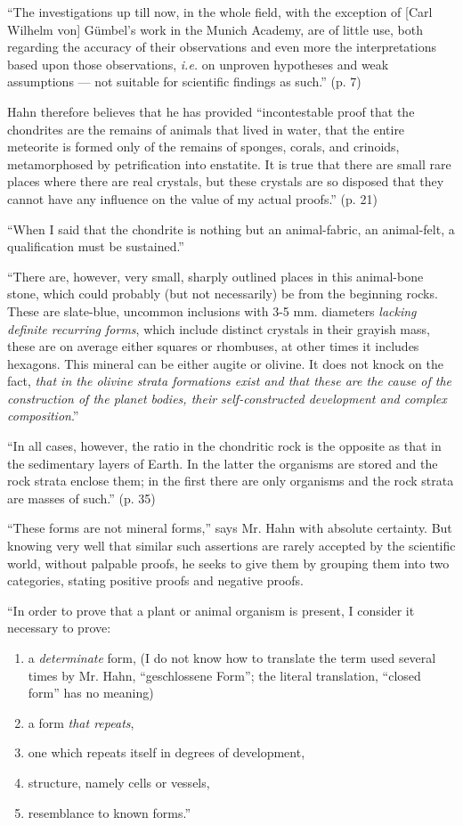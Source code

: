 \documentclass[a4paper, 12pt, oneside]{article}
\begin{document}
``The investigations up till now, in the whole field, with the exception of [Carl Wilhelm von] Gümbel's work in the Munich Academy, are of little use, both regarding the accuracy of their observations and even more the interpretations based upon those observations, \emph{i.e.} on unproven hypotheses and weak assumptions --- not suitable for scientific findings as such.'' (p. 7)

Hahn therefore believes that he has provided ``incontestable proof that the chondrites are the remains of animals that lived in water, that the entire meteorite is formed only of the remains of sponges, corals, and crinoids, metamorphosed by petrification into enstatite. It is true that there are small rare places where there are real crystals, but these crystals are so disposed that they cannot have any influence on the value of my actual proofs.'' (p. 21)

``When I said that the chondrite is nothing but an animal-fabric, an animal-felt, a qualification must be sustained.''

``There are, however, very small, sharply outlined places in this animal-bone stone, which could probably (but not necessarily) be from the beginning rocks. These are slate-blue, uncommon inclusions with 3-5 mm. diameters \emph{lacking definite recurring forms}, which include distinct crystals in their grayish mass, these are on average either squares or rhombuses, at other times it includes hexagons. This mineral can be either augite or olivine. It does not knock on the fact, \emph{that in the olivine strata formations exist and that these are the cause of the construction of the planet bodies, their self-constructed development and complex composition}.''

``In all cases, however, the ratio in the chondritic rock is the opposite as that in the sedimentary layers of Earth. In the latter the organisms are stored and the rock strata enclose them; in the first there are only organisms and the rock strata are masses of such.'' (p. 35)

``These forms are not mineral forms,'' says Mr. Hahn with absolute certainty. But knowing very well that similar such assertions are rarely accepted by the scientific world, without palpable proofs, he seeks to give them by grouping them into two categories, stating positive proofs and negative proofs.

``In order to prove that a plant or animal organism is present, I consider it necessary to prove:
\begin{enumerate}
\item a \emph{determinate} form, (I do not know how to translate the term used several times by Mr. Hahn, ``geschlossene Form''; the literal translation, ``closed form'' has no meaning)
\item a form \emph{that repeats},
\item one which repeats itself in degrees of development,
\item structure, namely cells or vessels,
\item resemblance to known forms.''
\end{enumerate}
\end{document}

